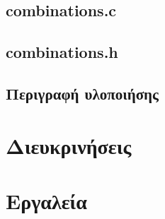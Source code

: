 \documentclass{article}
\begin{document}
    \subsection{combinations.c}



    \subsection{combinations.h}



    \subsection{Περιγραφή υλοποιήσης}

    

\section{Διευκρινήσεις}



\section{Εργαλεία}
\end{document}
